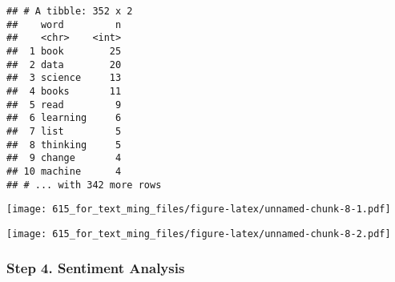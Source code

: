 \documentclass[]{article}
\newenvironment{Shaded}{\begin{snugshade}}{\end{snugshade}}
\newcommand{\KeywordTok}[1]{\textcolor[rgb]{0.13,0.29,0.53}{\textbf{{#1}}}}
\newcommand{\DataTypeTok}[1]{\textcolor[rgb]{0.13,0.29,0.53}{{#1}}}
\newcommand{\DecValTok}[1]{\textcolor[rgb]{0.00,0.00,0.81}{{#1}}}
\newcommand{\StringTok}[1]{\textcolor[rgb]{0.31,0.60,0.02}{{#1}}}
\newcommand{\CommentTok}[1]{\textcolor[rgb]{0.56,0.35,0.01}{\textit{{#1}}}}
\newcommand{\OtherTok}[1]{\textcolor[rgb]{0.56,0.35,0.01}{{#1}}}
\newcommand{\NormalTok}[1]{{#1}}
\begin{document}
\begin{Shaded}
\end{Shaded}

\begin{verbatim}
## # A tibble: 352 x 2
##    word         n
##    <chr>    <int>
##  1 book        25
##  2 data        20
##  3 science     13
##  4 books       11
##  5 read         9
##  6 learning     6
##  7 list         5
##  8 thinking     5
##  9 change       4
## 10 machine      4
## # ... with 342 more rows
\end{verbatim}

\begin{Shaded}
\end{Shaded}

\texttt{[image: 615\_for\_text\_ming\_files/figure-latex/unnamed-chunk-8-1.pdf]}

\begin{Shaded}
\end{Shaded}

\texttt{[image: 615\_for\_text\_ming\_files/figure-latex/unnamed-chunk-8-2.pdf]}

\subsubsection{Step 4. Sentiment
Analysis}\label{step-4.-sentiment-analysis}
\end{document}
